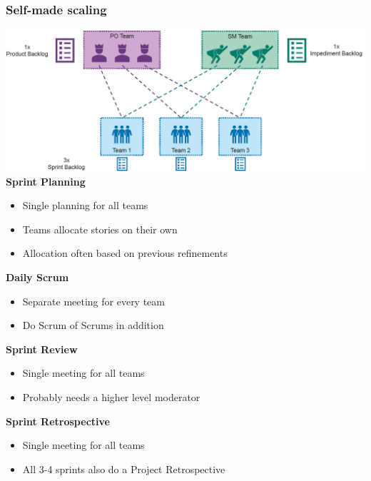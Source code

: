\subsubsection{Self-made scaling}
\includegraphics[width=\linewidth]{../img/self_made_scaling.png}
\textbf{Sprint Planning}
\begin{itemize}
    \item Single planning for all teams
    \item Teams allocate stories on their own
    \item Allocation often based on previous refinements
\end{itemize}
\textbf{Daily Scrum}
\begin{itemize}
    \item Separate meeting for every team
    \item Do Scrum of Scrums in addition
\end{itemize}
\textbf{Sprint Review}
\begin{itemize}
    \item Single meeting for all teams
    \item Probably needs a higher level moderator
\end{itemize}
\textbf{Sprint Retrospective}
\begin{itemize}
    \item Single meeting for all teams
    \item All 3-4 sprints also do a Project Retrospective
\end{itemize}

